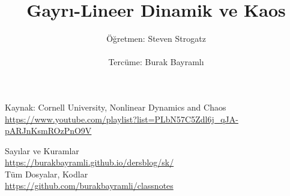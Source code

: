 \documentclass[12pt,a4paper]{report}
\title{Gayrı-Lineer Dinamik ve Kaos}
\author{Öğretmen: Steven Strogatz \\ \\  Tercüme: Burak Bayramlı}
\date{}
\begin{document}
\maketitle

\newpage

\begin{figure}[!hbp]
\end{figure}


\begin{center}
  
\vspace*{3cm}
Kaynak: Cornell University, Nonlinear Dynamics and Chaos \\
\vspace{0.5cm}
\url{https://www.youtube.com/playlist?list=PLbN57C5Zdl6j_qJA-pARJnKsmROzPnO9V} %
\vspace{0.5cm}
  
Sayılar ve Kuramlar\\
\vspace{0.5cm}
\url{https://burakbayramli.github.io/dersblog/sk/}\\
\vspace{0.5cm}
Tüm Dosyalar, Kodlar\\
\vspace{0.5cm}
\url{https://github.com/burakbayramli/classnotes}\\
\end{center}
\end{document}

